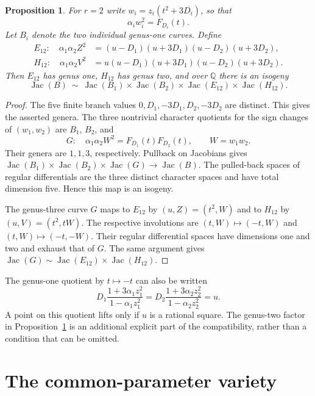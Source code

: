 \documentclass[11pt,a4paper]{article}
\newtheorem{proposition}[theorem]{Proposition}
\newcommand{\Q}{\mathbb Q}
\newcommand{\Jac}{\operatorname{Jac}}
\begin{document}
\begin{proposition}\label{prop:decomposition}
For $r=2$ write $w_i=z_i(t^2+3D_i)$, so that
\[
                    \alpha_iw_i^2=F_{D_i}(t).
\]
Let $B_i$ denote the two individual genus-one curves. Define
\begin{align*}
 E_{12}:\quad \alpha_1\alpha_2 Z^2
   &=(u-D_1)(u+3D_1)(u-D_2)(u+3D_2),\\
 H_{12}:\quad \alpha_1\alpha_2 V^2
   &=u(u-D_1)(u+3D_1)(u-D_2)(u+3D_2).
\end{align*}
Then $E_{12}$ has genus one, $H_{12}$ has genus two, and over $\Q$ there
is an isogeny
\[
 \Jac(B)\ \sim\ \Jac(B_1)\times\Jac(B_2)
                  \times\Jac(E_{12})\times\Jac(H_{12}).
\]
\end{proposition}
\begin{proof}
The five finite branch values $0,D_1,-3D_1,D_2,-3D_2$ are distinct.
This gives the asserted genera. The three nontrivial character quotients
for the sign changes of $(w_1,w_2)$ are $B_1$, $B_2$, and
\[
 G:\quad \alpha_1\alpha_2 W^2=F_{D_1}(t)F_{D_2}(t),
 \qquad W=w_1w_2.
\]
Their genera are $1,1,3$, respectively. Pullback on Jacobians gives
\(\Jac(B_1)\times\Jac(B_2)\times\Jac(G)\to\Jac(B)\).
The pulled-back spaces of regular differentials are the three distinct
character spaces and have total dimension five. Hence this map is an
isogeny.

The genus-three curve $G$ maps to $E_{12}$ by
$(u,Z)=(t^2,W)$ and to $H_{12}$ by $(u,V)=(t^2,tW)$.
The respective involutions are $(t,W)\mapsto(-t,W)$ and
$(t,W)\mapsto(-t,-W)$. Their regular differential spaces have dimensions
one and two and exhaust that of $G$. The same argument gives
$\Jac(G)\sim\Jac(E_{12})\times\Jac(H_{12})$.
\end{proof}

The genus-one quotient by $t\mapsto-t$ can also be written
\[
 D_1\frac{1+3\alpha_1z_1^2}{1-\alpha_1z_1^2}
 =D_2\frac{1+3\alpha_2z_2^2}{1-\alpha_2z_2^2}=u.
\]
A point on this quotient lifts only if $u$ is a rational square.
The genus-two factor in Proposition~\ref{prop:decomposition} is an
additional explicit part of the compatibility, rather than a condition
that can be omitted.

\section{The common-parameter variety}
\end{document}
